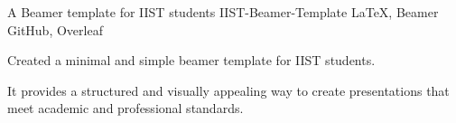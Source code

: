 \begin{cventries}
  \cventry
  {A Beamer template for IIST students} %
  {IIST-Beamer-Template} %
  {LaTeX, Beamer} %
  {GitHub, Overleaf} %
  {
    \begin{cvitems} %
      \item {Created a minimal and simple beamer template for IIST students.}
      \item {It provides a structured and visually appealing way to create presentations that meet academic and professional standards.}
    \end{cvitems}
  }
\end{cventries}
